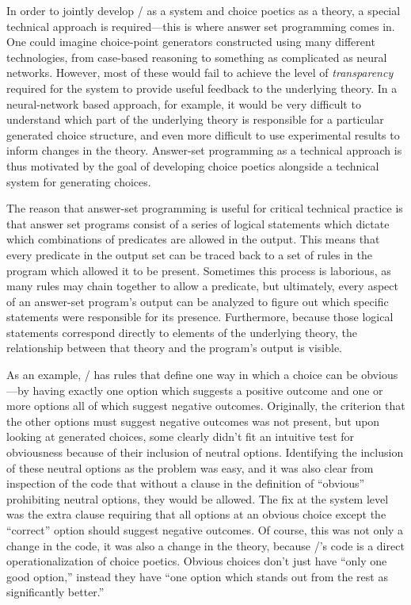 In order to jointly develop \dunyazad/ as a system and choice poetics as a theory, a special technical approach is required---this is where answer set programming comes in.
%
One could imagine choice-point generators constructed using many different technologies, from case-based reasoning to something as complicated as neural networks.
%
However, most of these would fail to achieve the level of \emph{transparency} required for the system to provide useful feedback to the underlying theory.
%
In a neural-network based approach, for example, it would be very difficult to understand which part of the underlying theory is responsible for a particular generated choice structure, and even more difficult to use experimental results to inform changes in the theory.
%
Answer-set programming as a technical approach is thus motivated by the goal of developing choice poetics alongside a technical system for generating choices.


The reason that answer-set programming is useful for critical technical practice is that answer set programs consist of a series of logical statements which dictate which combinations of predicates are allowed in the output.
%
This means that every predicate in the output set can be traced back to a set of rules in the program which allowed it to be present.
%
Sometimes this process is laborious, as many rules may chain together to allow a predicate, but  ultimately, every aspect of an answer-set program's output can be analyzed to figure out which specific statements were responsible for its presence.
%
Furthermore, because those logical statements correspond directly to elements of the underlying theory, the relationship between that theory and the program's output is visible.


As an example, \dunyazad/ has rules that define one way in which a choice can be obvious---by having exactly one option which suggests a positive outcome and one or more options all of which suggest negative outcomes.
%
Originally, the criterion that the other options must suggest negative outcomes was not present, but upon looking at generated choices, some clearly didn't fit an intuitive test for obviousness because of their inclusion of neutral options.
%
Identifying the inclusion of these neutral options as the problem was easy, and it was also clear from inspection of the code that without a clause in the definition of ``obvious'' prohibiting neutral options, they would be allowed.
%
The fix at the system level was the extra clause requiring that all options at an obvious choice except the ``correct'' option should suggest negative outcomes.
%
Of course, this was not only a change in the code, it was also a change in the theory, because \dunyazad/'s code is a direct operationalization of choice poetics.
%
Obvious choices don't just have ``only one good option,'' instead they have ``one option which stands out from the rest as significantly better.''


